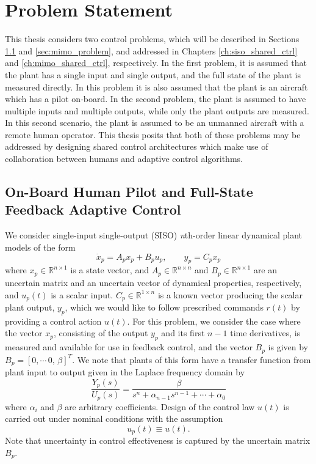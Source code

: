 \chapter{Problem Statement} \label{ch:problem}

This thesis considers two control problems, which will be described in Sections \ref{sec:siso_problem} and \ref{sec:mimo_problem}, and addressed in Chapters \ref{ch:siso_shared_ctrl} and \ref{ch:mimo_shared_ctrl}, respectively. In the first problem, it is assumed that the plant has a single input and single output, and the full state of the plant is measured directly. In this problem it is also assumed that the plant is an aircraft which has a pilot on-board. In the second problem, the plant is assumed to have multiple inputs and multiple outputs, while only the plant outputs are measured. In this second scenario, the plant is assumed to be an unmanned aircraft with a remote human operator. This thesis posits that both of these problems may be addressed by designing shared control architectures which make use of collaboration between humans and adaptive control algorithms.

\section{On-Board Human Pilot and Full-State Feedback Adaptive Control} \label{sec:siso_problem}

We consider single-input single-output (SISO) \textit{n}th-order linear dynamical plant models of the form 
\begin{equation}
\dot x_p = A_p x_p + B_p u_p	, \qquad y_p = C_p x_p \label{eq:siso_plant}
\end{equation} 
\noindent where $x_p \in \mathbb{R}^{n \times 1}$ is a state vector, and $A_p \in \mathbb{R}^{n \times n}$ and $B_p \in \mathbb{R}^{n \times 1}$ are an uncertain matrix and an uncertain vector of dynamical properties, respectively, and $u_p(t)$ is a scalar input. $C_p \in \mathbb{R}^{1 \times n}$ is a known vector producing the scalar plant output, $y_p$, which we would like to follow prescribed commands $r(t)$ by providing a control action $u(t)$. For this problem, we consider the case where the vector $x_p$, consisting of the output $y_p$ and its first $n-1$ time derivatives, is measured and available for use in feedback control, and the vector $B_p$ is given by $B_p = [0, \cdots \, 0, \, \beta]^T$. We note that plants of this form have a transfer function from plant input to output given in the Laplace frequency domain by
\begin{equation}
\frac{Y_p(s)}{U_p(s)} = \frac{\beta}{s^n + \alpha_{n-1} s^{n-1} + \cdots + \alpha_0}	
\end{equation}
where $\alpha_i$ and $\beta$ are arbitrary coefficients. Design of the control law $u(t)$ is carried out under nominal conditions with the assumption
\begin{equation}
	u_p(t) \equiv u(t). \label{eq:siso_plant_input_nom}
\end{equation}
Note that uncertainty in control effectiveness is captured by the uncertain matrix $B_p$. 

